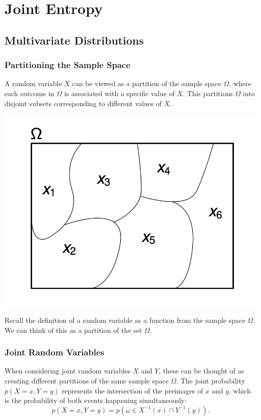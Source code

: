 \chapter{Joint Entropy}

\section{Multivariate Distributions}

\subsection{Partitioning the Sample Space}
A random variable \( X \) can be viewed as a partition of the sample space \( \Omega \), where each outcome in \( \Omega \) is associated with a specific value of \( X \). This partitions \( \Omega \) into disjoint subsets corresponding to different values of \( X \).

\begin{marginfigure}
    \includegraphics[width=1\textwidth]{img/partition.png}
    \caption{Recall the definition of a random variable as a function from the sample space $\Omega$. We can think of this as a partition of the set $\Omega$.}
\end{marginfigure}


\subsection{Joint Random Variables}
When considering joint random variables \( X \) and \( Y \), these can be thought of as creating different partitions of the same sample space \( \Omega \). The joint probability \( p(X = x, Y = y) \) represents the intersection of the preimages of \( x \) and \( y \), which is the probability of both events happening simultaneously:
\[
    p(X = x, Y = y) = p(\omega \in X^{-1}(x) \cap Y^{-1}(y)).
\]

